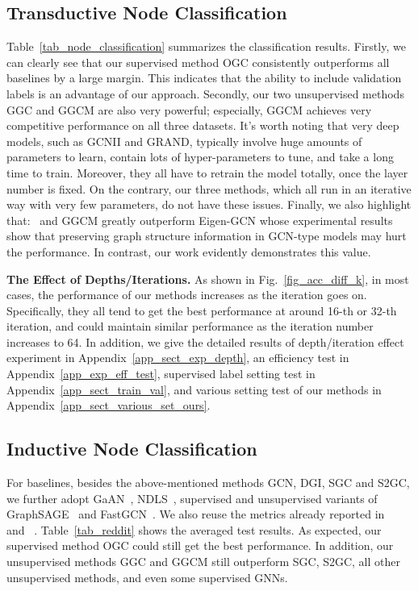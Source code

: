 \subsection{Transductive Node Classification}\label{sub_sect_node_clf}
\vspace{-5pt}
Table~\ref{tab_node_classification} summarizes the classification results.
Firstly, we can clearly see that our supervised method OGC consistently outperforms all baselines by a large margin.
This indicates that the ability to include validation labels is an advantage of our approach.
Secondly, our two unsupervised methods GGC and GGCM are also very powerful; especially, GGCM achieves very competitive performance on all three datasets.
It's worth noting that very deep models, such as GCNII and GRAND, typically involve huge amounts of parameters to learn, contain lots of hyper-parameters to tune, and take a long time to train.
Moreover, they all have to retrain the model totally, once the layer number is fixed.
On the contrary, our three methods, which all run in an iterative way with very few parameters, do not have these issues.
Finally, we also highlight that: \mygspalg\ and GGCM greatly outperform Eigen-GCN whose experimental results show that preserving graph structure information in GCN-type models may hurt the performance.
In contrast, our work evidently demonstrates this value.



\textbf{The Effect of Depths/Iterations.}
As shown in Fig.~\ref{fig_acc_diff_k}, in most cases, the performance of our methods increases as the iteration goes on.
Specifically, they all tend to get the best performance at around 16-th or 32-th iteration, and could maintain similar performance as the iteration number increases to 64.
In addition, we give the detailed results of depth/iteration effect experiment in Appendix~\ref{app_sect_exp_depth}, an efficiency test in Appendix~\ref{app_exp_eff_test}, supervised label setting test in Appendix~\ref{app_sect_train_val}, and various setting test of our methods in Appendix~\ref{app_sect_various_set_ours}.


\vspace{-5pt}
\subsection{Inductive Node Classification}
\vspace{-5pt}
For baselines, besides the above-mentioned methods GCN, DGI, SGC and S2GC, we further adopt GaAN~\citep{zhang2018gaan}, NDLS~\citep{zhang2021node}, supervised and unsupervised variants of GraphSAGE~\citep{hamilton2017inductive} and FastGCN~\citep{chen2018fastgcn}.
We also reuse the metrics already reported in ~\citet{wu2019simplifying} and ~\citet{chen2018fastgcn}.
Table~\ref{tab_reddit} shows the averaged test results. As expected, our supervised method OGC could still get the best performance.
In addition, our unsupervised methods GGC and GGCM still outperform SGC, S2GC, all other unsupervised methods, and even some supervised GNNs.


